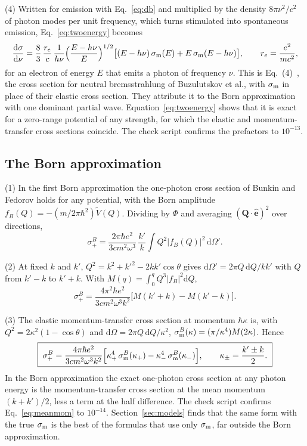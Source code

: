 \documentclass[11pt]{article}
\numberwithin{equation}{section}
\newcommand{\ehat}{\hat{\mathbf e}}
\newcommand{\Qv}{\mathbf Q}
\newcommand{\dd}{\mathrm d}
\newcommand{\sm}{\sigma_{\rm m}}
\begin{document}
{\noindent}(4) Written for emission with Eq.~\eqref{eq:db} and multiplied by
the density $8\pi\nu^2/c^2$ of photon modes per unit frequency, which turns
stimulated into spontaneous emission, Eq.~\eqref{eq:twoenergy} becomes
\begin{equation}
\frac{\dd\sigma}{\dd\nu}=\frac83\,\frac{r_e}{c}\,\frac{1}{h\nu}
\Big(\frac{E-h\nu}{E}\Big)^{1/2}\big[(E-h\nu)\,\sm(E)+E\,\sm(E-h\nu)\big],
\qquad r_e=\frac{e^2}{mc^2},
\label{eq:nbrs}
\end{equation}
for an electron of energy $E$ that emits a photon of frequency $\nu$. This is
Eq.~(4)~\cite{Buzulutskov2018}, the cross section for neutral bremsstrahlung
of Buzulutskov et al., with $\sm$ in place of their elastic cross section.
They attribute it to the Born approximation with one dominant partial wave.
Equation~\eqref{eq:twoenergy} shows that it is exact for a zero-range
potential of any strength, for which the elastic and momentum-transfer cross
sections coincide. The check script confirms the prefactors to $10^{-13}$.

\subsection{The Born approximation}
\label{sec:born}
{\noindent}(1) In the first Born approximation the one-photon cross section of
Bunkin and Fedorov \cite{BunkinFedorov1966} holds for any potential, with the Born amplitude
$f_B(Q)=-(m/2\pi\hbar^2)\tilde V(Q)$. Dividing by $\Phi$ and averaging
$(\Qv\cdot\ehat)^2$ over directions,
\begin{equation}
\sigma_+^B=\frac{2\pi\hbar e^2}{3cm^2\omega^3}\,\frac{k'}{k}\int Q^2|f_B(Q)|^2\,\dd\Omega' .
\end{equation}

{\noindent}(2) At fixed $k$ and $k'$, $Q^2=k^2+k'^2-2kk'\cos\theta$ gives
$\dd\Omega'=2\pi Q\,\dd Q/kk'$ with $Q$ from $k'-k$ to $k'+k$. With
$M(q)=\int_0^qQ^3|f_B|^2\dd Q$,
\begin{equation}
\sigma_+^B=\frac{4\pi^2\hbar e^2}{3cm^2\omega^3k^2}\big[M(k'+k)-M(k'-k)\big].
\end{equation}

{\noindent}(3) The elastic momentum-transfer cross section at momentum
$\hbar\kappa$ is, with $Q^2=2\kappa^2(1-\cos\theta)$ and
$\dd\Omega=2\pi Q\,\dd Q/\kappa^2$,
$\sm^B(\kappa)=(\pi/\kappa^4)M(2\kappa)$. Hence
\begin{equation}
\boxed{\;\sigma_+^B=\frac{4\pi\hbar e^2}{3cm^2\omega^3k^2}
\Big[\kappa_+^4\,\sm^B(\kappa_+)-\kappa_-^4\,\sm^B(\kappa_-)\Big],\qquad
\kappa_\pm=\frac{k'\pm k}{2}.\;}
\label{eq:meanmom}
\end{equation}
In the Born approximation the exact one-photon cross section at any photon
energy is the momentum-transfer cross section at the mean momentum
$(k+k')/2$, less a term at the half difference. The check script confirms
Eq.~\eqref{eq:meanmom} to $10^{-14}$. Section~\ref{sec:models} finds that the
same form with the true $\sm$ is the best of the formulas that use only $\sm$,
far outside the Born approximation.
\end{document}
